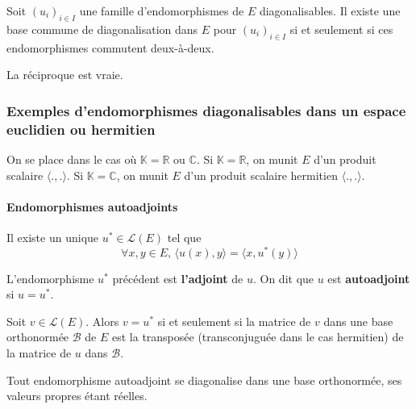 
  \begin{theorem}
    Soit $(u_i)_{i \in I}$ une famille d'endomorphismes de $E$ diagonalisables. Il existe une base commune de diagonalisation dans $E$ pour $(u_i)_{i \in I}$ si et seulement si ces endomorphismes commutent deux-à-deux.
  \end{theorem}

  \begin{remark}
    La réciproque est vraie.
  \end{remark}

  \subsubsection{Exemples d'endomorphismes diagonalisables dans un espace euclidien ou hermitien}

  On se place dans le cas où $\mathbb{K} = \mathbb{R}$ ou $\mathbb{C}$.
  Si $\mathbb{K} = \mathbb{R}$, on munit $E$ d'un produit scalaire $\langle ., . \rangle$. Si $\mathbb{K} = \mathbb{C}$, on munit $E$ d'un produit scalaire hermitien $\langle ., . \rangle$.

  \paragraph{Endomorphismes autoadjoints}


  \begin{lemma}
    Il existe un unique $u^* \in \mathcal{L}(E)$ tel que
    \[ \forall x, y \in E, \, \langle u(x), y \rangle = \langle x, u^*(y) \rangle \]
  \end{lemma}

  \begin{definition}
    L'endomorphisme $u^*$ précédent est \textbf{l'adjoint} de $u$. On dit que $u$ est \textbf{autoadjoint} si $u = u^*$.
  \end{definition}

  \begin{proposition}
    Soit $v \in \mathcal{L}(E)$. Alors $v = u^*$ si et seulement si la matrice de $v$ dans une base orthonormée $\mathcal{B}$ de $E$ est la transposée (transconjuguée dans le cas hermitien) de la matrice de $u$ dans $\mathcal{B}$.
  \end{proposition}

  \begin{theorem}
    Tout endomorphisme autoadjoint se diagonalise dans une base orthonormée, ses valeurs propres étant réelles.
  \end{theorem}

